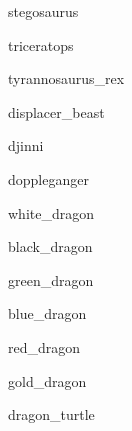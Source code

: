 \documentclass[letterpaper,serif]{module}
\begin{document}

\begin{newmonster}{stegosaurus}\end{newmonster}

\begin{newmonster}{triceratops}\end{newmonster}

\begin{newmonster}{tyrannosaurus_rex}\end{newmonster}

\begin{newmonster}{displacer_beast}\end{newmonster}

\begin{newmonster}{djinni}\end{newmonster}

\begin{newmonster}{doppleganger}\end{newmonster}


\begin{newmonster}{white_dragon}\end{newmonster}

\begin{newmonster}{black_dragon}\end{newmonster}

\begin{newmonster}{green_dragon}\end{newmonster}

\begin{newmonster}{blue_dragon}\end{newmonster}

\begin{newmonster}{red_dragon}\end{newmonster}

\begin{newmonster}{gold_dragon}\end{newmonster}

\begin{newmonster}{dragon_turtle}\end{newmonster}
\end{document}
